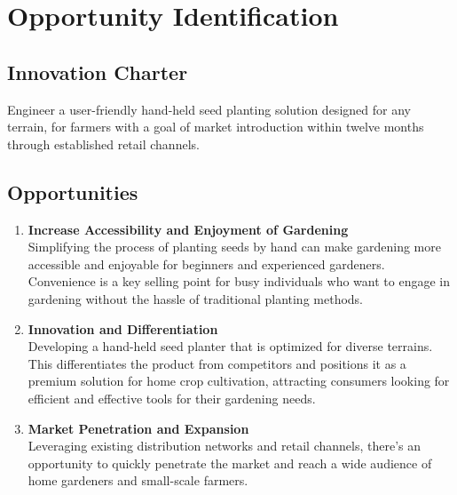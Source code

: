 \section{Opportunity Identification}

\subsection{Innovation Charter}
Engineer a user-friendly hand-held seed planting solution designed for any terrain, for farmers with a goal of market introduction within twelve months through established retail channels.

\subsection{Opportunities}

\begin{enumerate}
    \item \textbf{Increase Accessibility and Enjoyment of Gardening} \\
    Simplifying the process of planting seeds by hand can make gardening more accessible and enjoyable for beginners and experienced gardeners. Convenience is a key selling point for busy individuals who want to engage in gardening without the hassle of traditional planting methods.
    
    \item \textbf{Innovation and Differentiation} \\
    Developing a hand-held seed planter that is optimized for diverse terrains. This differentiates the product from competitors and positions it as a premium solution for home crop cultivation, attracting consumers looking for efficient and effective tools for their gardening needs.
    
    \item \textbf{Market Penetration and Expansion} \\
    Leveraging existing distribution networks and retail channels, there's an opportunity to quickly penetrate the market and reach a wide audience of home gardeners and small-scale farmers.
\end{enumerate}
